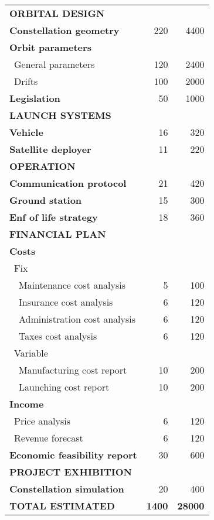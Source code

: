 \begin{longtable}{| l | r | r | }
\rowcolor[gray]{0.85}	\textbf{ORBITAL DESIGN} &  & \\

	\textbf{Constellation geometry} & 220  & 4400  \\
	\hline
	\textbf{Orbit parameters} &   &  \\
	   \blue ~General parameters & 120  & 2400  \\
	   \blue ~Drifts & 100 & 2000  \\
	\hline
	\textbf{Legislation} & 50 & 1000 \\
   
\rowcolor[gray]{0.85} \textbf{LAUNCH SYSTEMS} &  &   \\
	
	\textbf{Vehicle} & 16 & 320 \\
	\hline
	\textbf{Satellite deployer} & 11  & 220 \\

\rowcolor[gray]{0.85} \textbf{OPERATION} &  &  \\
	
	\textbf{Communication protocol} & 21 & 420\\
	\hline
	\textbf{Ground station} & 15 & 300 \\
	\hline
	\textbf{Enf of life strategy} & 18  & 360 \\
	\hline

\pagebreak

	\hline
\rowcolor[gray]{0.85} \textbf{FINANCIAL PLAN} &  & \\
	
	\textbf{Costs} & & \\
	   \blue ~Fix &  &   \\
	   ~~Maintenance cost analysis & 5 & 100 \\
	   ~~Insurance cost analysis & 6 & 120 \\
	   ~~Administration cost analysis & 6 & 120 \\
	   ~~Taxes cost analysis & 6 & 120 \\
	   \blue ~Variable &  &  \\
	   ~~Manufacturing cost report & 10 & 200 \\
	   ~~Launching cost report & 10 & 200 \\
	\hline
	\textbf{Income} &   &  \\
	   \blue ~Price analysis & 6  & 120  \\
	   \blue ~Revenue forecast & 6  & 120  \\
	\hline
	\textbf{Economic feasibility report} & 30 & 600 \\

\rowcolor[gray]{0.85} \textbf{PROJECT EXHIBITION} & &  \\

	\textbf{Constellation simulation} & 20 & 400 \\


\rowcolor[gray]{0.65} \textbf{TOTAL ESTIMATED} & \textbf{1400} & \textbf{28000} \\
       \hline

\end{longtable}

